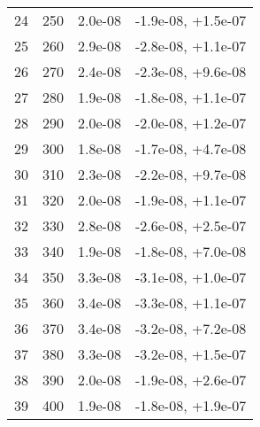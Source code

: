 \begin{table}
\begin{adjustbox}{width=1\textwidth/2}
\begin{tabular}{|c|c|c|c|}
\cline{1-4}
24 & 250 & 2.0e-08 & -1.9e-08, +1.5e-07 \\
\cline{1-4}
25 & 260 & 2.9e-08 & -2.8e-08, +1.1e-07 \\
\cline{1-4}
26 & 270 & 2.4e-08 & -2.3e-08, +9.6e-08 \\
\cline{1-4}
27 & 280 & 1.9e-08 & -1.8e-08, +1.1e-07 \\
\cline{1-4}
28 & 290 & 2.0e-08 & -2.0e-08, +1.2e-07 \\
\cline{1-4}
29 & 300 & 1.8e-08 & -1.7e-08, +4.7e-08 \\
\cline{1-4}
30 & 310 & 2.3e-08 & -2.2e-08, +9.7e-08 \\
\cline{1-4}
31 & 320 & 2.0e-08 & -1.9e-08, +1.1e-07 \\
\cline{1-4}
32 & 330 & 2.8e-08 & -2.6e-08, +2.5e-07 \\
\cline{1-4}
33 & 340 & 1.9e-08 & -1.8e-08, +7.0e-08 \\
\cline{1-4}
34 & 350 & 3.3e-08 & -3.1e-08, +1.0e-07 \\
\cline{1-4}
35 & 360 & 3.4e-08 & -3.3e-08, +1.1e-07 \\
\cline{1-4}
36 & 370 & 3.4e-08 & -3.2e-08, +7.2e-08 \\
\cline{1-4}
37 & 380 & 3.3e-08 & -3.2e-08, +1.5e-07 \\
\cline{1-4}
38 & 390 & 2.0e-08 & -1.9e-08, +2.6e-07 \\
\cline{1-4}
39 & 400 & 1.9e-08 & -1.8e-08, +1.9e-07 \\
\cline{1-4}
\end{tabular}
\end{adjustbox}
\end{table}

